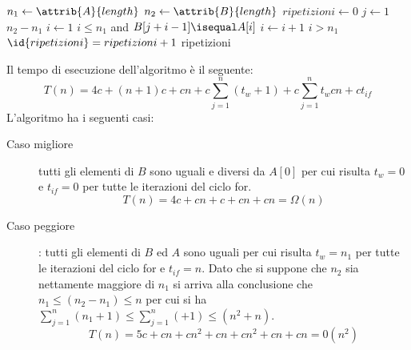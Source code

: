 \begin{codebox}
\li $n_1 \gets \attrib{A}{length}$
\li $n_2 \gets \attrib{B}{length}$
\li $ripetizioni \gets 0$
\li \For $j \gets 1$ \To $n_2 - n_1$
    \Do
\li                $i \gets 1$
\li                \While $i \leq n_1$ and $B[j+i-1] \isequal A[i]$
                   \Do
\li                               $i \gets i + 1$
                   \End
\li                \If $i > n_1$
                   \Then
\li                               $\id{ripetizioni} = ripetizioni + 1$
    \End
\li \Return ripetizioni
\end{codebox}
Il tempo di esecuzione dell'algoritmo è il seguente:
\begin{equation*}
  T(n) = 4c + (n+1)c + cn + c\sum _{j = 1} ^ n (t_{w} + 1) + c\sum _{j = 1} ^ n t_w
         cn + ct_{if}
\end{equation*}
L'algoritmo ha i seguenti casi:
\begin{description}
  \item[Caso migliore] tutti gli elementi di $B$ sono uguali e diversi da $A[0]$
        per cui risulta $t_w = 0$ e $t_{if} = 0$ per tutte le iterazioni del ciclo for.
        \begin{equation*}
          T(n) = 4c + cn + c + cn + cn = \Omega(n)
        \end{equation*}
  \item[Caso peggiore]: tutti gli elementi di $B$ ed $A$ sono uguali per cui risulta
         $t_w = n_1$ per tutte le iterazioni del ciclo for e $t_{if} = n$.
         Dato che si suppone che $n_2$ sia nettamente maggiore di $n_1$ si arriva
         alla conclusione che $n_1 \leq (n_2-n_1) \leq n$ per cui si ha $\sum _{j = 1} ^ n (n_1 + 1)
         \leq \sum _{j = 1} ^ n ( + 1) \leq (n^2 + n)$.
         \begin{equation*}
           T(n) = 5c + cn + cn^2 + cn + cn^2 + cn + cn = 0(n^2)
         \end{equation*}
\end{description}


